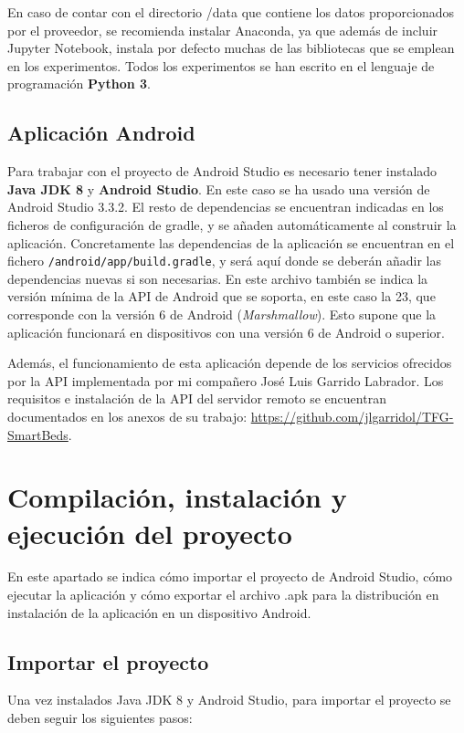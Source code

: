 En caso de contar con el directorio /data que contiene los datos proporcionados por el proveedor, se recomienda instalar Anaconda, ya que además de incluir Jupyter Notebook, instala por defecto muchas de las bibliotecas que se emplean en los experimentos. Todos los experimentos se han escrito en el lenguaje de programación \textbf{Python 3}. 

\subsection{Aplicación Android}

Para trabajar con el proyecto de Android Studio es necesario tener instalado \textbf{Java JDK 8} y \textbf{Android Studio}. En este caso se ha usado una versión de Android Studio 3.3.2. El resto de dependencias se encuentran indicadas en los ficheros de configuración de gradle, y se añaden automáticamente al construir la aplicación. Concretamente las dependencias de la aplicación se encuentran en el fichero \texttt{/android/app/build.gradle}, y será aquí donde se deberán añadir las dependencias nuevas si son necesarias. En este archivo también se indica la versión mínima de la API de Android que se soporta, en este caso la 23, que corresponde con la versión 6 de Android (\textit{Marshmallow}). Esto supone que la aplicación funcionará en dispositivos con una versión 6 de Android o superior. 

Además, el funcionamiento de esta aplicación depende de los servicios ofrecidos por la API implementada por mi compañero José Luis Garrido Labrador. Los requisitos e instalación de la API del servidor remoto se encuentran documentados en los anexos de su trabajo: \url{https://github.com/jlgarridol/TFG-SmartBeds}.

\section{Compilación, instalación y ejecución del proyecto}

En este apartado se indica cómo importar el proyecto de Android Studio, cómo ejecutar la aplicación y cómo exportar el archivo .apk para la distribución en instalación de la aplicación en un dispositivo Android. 

\subsection{Importar el proyecto}

Una vez instalados Java JDK 8 y Android Studio, para importar el proyecto se deben seguir los siguientes pasos: 

